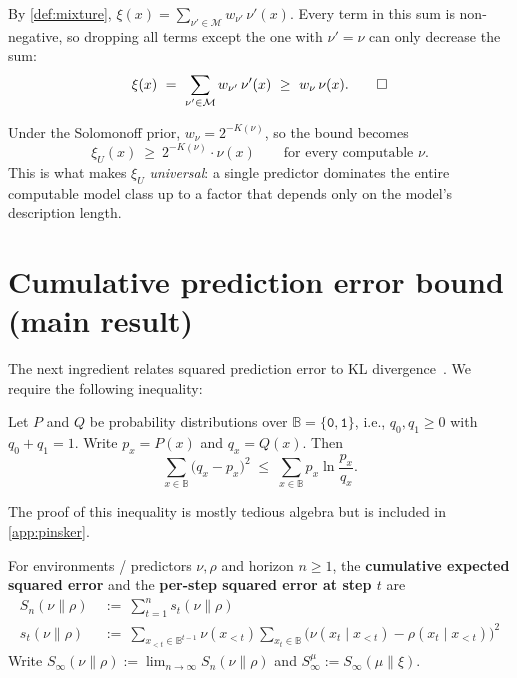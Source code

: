 \documentclass[fontsize=11pt, parskip=half]{scrartcl}
\newcommand{\Mc}{\mathcal{M}}
\newcommand{\Sn}[2]{S_{n}(#1 \parallel #2)}
\begin{document}
\begin{solution}
By \cref{def:mixture}, $\xi(x) = \sum_{\nu' \in \Mc} w_{\nu'} \,\nu'(x)$.
Every term in this sum is non-negative, so dropping all terms except the one with
$\nu' = \nu$ can only decrease the sum:
\[
  \xi(x) ~=~ \sum_{\nu' \in \Mc} w_{\nu'}\, \nu'(x)
  ~\geq~ w_\nu\, \nu(x). \qedhere
\]
\end{solution}

\begin{remark}
Under the Solomonoff prior, $w_\nu = 2^{-K(\nu)}$, so the bound becomes
\[
  \xi_U(x) ~\geq~ 2^{-K(\nu)} \cdot \nu(x) \qquad \text{for every computable }\nu.
\]
This is what makes $\xi_U$ \emph{universal}: a single predictor dominates the
entire computable model class up to a factor that depends only on the model's
description length.
\end{remark}

\section{Cumulative prediction error bound (main result)}\label{prob:bound}


The next ingredient relates squared prediction error to KL divergence~\cite[Lemma~11.6.1]{Cover:06}. 
We require the following inequality:

\begin{theorem}\label{thm:pinsker}
Let $P$ and $Q$ be probability distributions over $\mathbb{B} = \{\texttt{0}, \texttt{1}\}$, i.e., $q_0, q_1 \geq 0$
with $q_0 + q_1 = 1$. Write $p_x = P(x)$ and $q_x = Q(x)$. Then
\[
    \sum_{x \in \mathbb{B}} \big( q_x - p_x \big)^2 \;\leq\; \sum_{x \in \mathbb{B}} p_x \ln \frac{p_x}{q_x}.
    \tag{$\star$}
\]

\end{theorem}
The proof of this inequality is mostly tedious algebra but is included in \cref{app:pinsker}. 


\begin{definition}\label{def:S_infty}
For environments / predictors $\nu, \rho$ and horizon $n \geq 1$, the \textbf{cumulative expected squared error} and the \textbf{per-step squared error at step $t$} are
\begin{align*}
\Sn{\nu}{\rho} ~&:=~ \sum_{t=1}^n s_t(\nu \parallel \rho) \\
s_t(\nu \parallel \rho) ~&:=~ \sum_{x_{<t} \in \mathbb{B}^{t-1}} \nu(x_{<t}) \sum_{x_t \in \mathbb{B}} \bigl(\nu(x_t \mid x_{<t}) - \rho(x_t \mid x_{<t})\bigr)^2
\end{align*}
Write $S_{\infty}(\nu \parallel \rho) := \lim_{n \to \infty} \Sn{\nu}{\rho}$
and $S_\infty^\mu := S_{\infty}(\mu \parallel \xi)$.
\end{definition}
\end{document}
